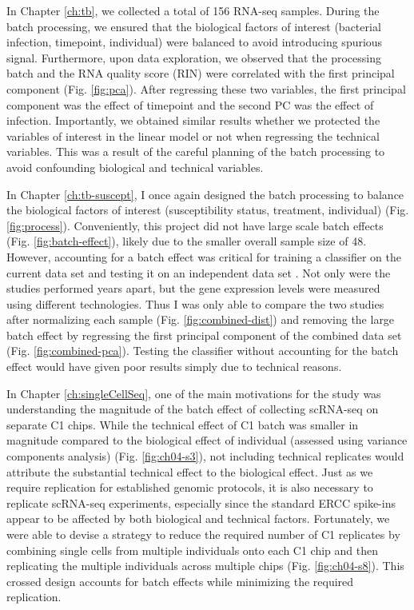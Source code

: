 In Chapter \ref{ch:tb}, we collected a total of 156 RNA-seq
samples. During the batch processing, we ensured that the biological
factors of interest (bacterial infection, timepoint, individual) were
balanced to avoid introducing spurious signal. Furthermore, upon data
exploration, we observed that the processing batch and the RNA quality
score (RIN) were correlated with the first principal component (Fig. \ref{fig:pca}). After
regressing these two variables, the first principal component was the
effect of timepoint and the second PC was the effect of
infection. Importantly, we obtained similar results whether we
protected the variables of interest in the linear model or not when
regressing the technical variables. This was a result of the careful
planning of the batch processing to avoid confounding biological and
technical variables.

In Chapter \ref{ch:tb-suscept}, I once again designed the batch
processing to balance the biological factors of interest
(susceptibility status, treatment, individual) (Fig. \ref{fig:process}). Conveniently, this
project did not have large scale batch effects (Fig. \ref{fig:batch-effect}), likely due to the
smaller overall sample size of 48. However, accounting for a batch
effect was critical for training a classifier on the current data set
and testing it on an independent data set \citep{Barreiro2012}.
Not only were the studies
performed years apart, but the gene expression levels were measured
using different technologies. Thus I was only able to compare the two
studies after normalizing each sample (Fig. \ref{fig:combined-dist}) and removing the large batch
effect by regressing the first principal component of the combined
data set (Fig. \ref{fig:combined-pca}). Testing the classifier without accounting for the batch
effect would have given poor results simply due to technical reasons.

In Chapter \ref{ch:singleCellSeq}, one of the main motivations for the
study was understanding the magnitude of the batch effect of
collecting scRNA-seq on separate C1 chips. While the technical effect
of C1 batch was smaller in magnitude compared to the biological effect
of individual (assessed using variance components analysis) (Fig. \ref{fig:ch04-s3}), not
including technical replicates would attribute the substantial
technical effect to the biological effect. Just as we require
replication for established genomic protocols, it is also necessary to
replicate scRNA-seq experiments, especially since the standard ERCC
spike-ins appear to be affected by both biological and technical
factors. Fortunately, we were able to devise a strategy to reduce the
required number of C1 replicates by combining single cells from
multiple individuals onto each C1 chip and then replicating the
multiple individuals across multiple chips (Fig. \ref{fig:ch04-s8}). This crossed design
accounts for batch effects while minimizing the required replication.

